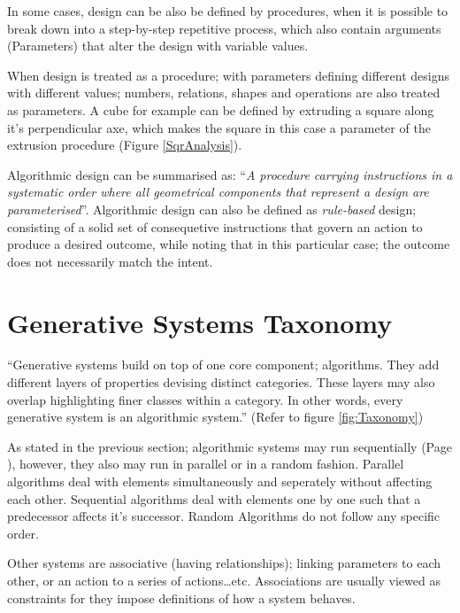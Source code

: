 In some cases, design can be also be defined by procedures, when it is possible to break down into a step-by-step repetitive process, which also contain arguments (Parameters) that alter the design with variable values. \label{SequentialAlgorithms}

When design is treated as a procedure; with parameters defining different designs with different values; numbers, relations, shapes and operations are also treated as parameters. A cube for example can be defined by extruding a square along it's perpendicular axe, which makes the square in this case a parameter of the extrusion procedure (Figure \ref{SqrAnalysis}).

Algorithmic design can be summarised as: ``\emph{A procedure carrying instructions in a systematic order where all geometrical components that represent a design are parameterised}''\cite{hernandez06}. Algorithmic design can also be defined as \emph{rule-based} design; consisting of a solid set of consequetive instructions that govern an action to produce a desired outcome, while noting that in this particular case; the outcome does not necessarily match the intent.

\clearpage
\section{Generative Systems Taxonomy}

\label{GenSysTax}
``Generative systems build on top of one core component; algorithms. They add different layers of properties devising distinct categories. These layers may also overlap highlighting finer classes within a category. In other words, every generative system is an algorithmic system.'' \cite{khaldi04} (Refer to figure \ref{fig:Taxonomy})

As stated in the previous section; algorithmic systems may run sequentially (Page \pageref{SequentialAlgorithms}), however, they also may run in parallel or in a random fashion. Parallel algorithms deal with elements simultaneously and seperately without affecting each other. Sequential algorithms deal with elements one by one such that a predecessor affects it's successor. Random Algorithms do not follow any specific order. \cite{khaldi04}

Other systems are associative (having relationships); linking parameters to each other, or an action to a series of actions\ldots etc. Associations are usually viewed as constraints for they impose definitions of how a system behaves. \cite{khaldi04}

